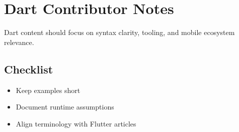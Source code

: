 \section{Dart Contributor Notes}

Dart content should focus on syntax clarity, tooling, and mobile ecosystem relevance.

\subsection{Checklist}
\begin{itemize}
  \item Keep examples short
  \item Document runtime assumptions
  \item Align terminology with Flutter articles
\end{itemize}
